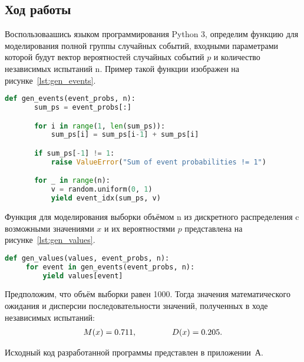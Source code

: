 \subsection{Ход работы}

Воспользоваашись языком программирования Python 3, определим функцию для
моделирования полной группы случайных событий, входными параметрами которой
будут вектор вероятностей случайных событий $ p $ и количество независимых
испытаний n. Пример такой функции изображен на рисунке~\ref{lst:gen_events}.
\begin{lstlisting}[caption=Функция для моделирования полной группы случайных событий,
label=lst:gen_events, language=python, basicstyle=\scriptsize\ttfamily]
  def gen_events(event_probs, n):
       sum_ps = event_probs[:]

       for i in range(1, len(sum_ps)):
           sum_ps[i] = sum_ps[i-1] + sum_ps[i]

       if sum_ps[-1] != 1:
           raise ValueError("Sum of event probabilities != 1")

       for _ in range(n):
           v = random.uniform(0, 1)
           yield event_idx(sum_ps, v)
\end{lstlisting}

Функция для моделирования выборки объёмом n из дискретного распределения c
возможными значениями $ x $ и их вероятностями $ p $ представлена на
рисунке~\ref{lst:gen_values}.
\begin{lstlisting}[caption=Функция для моделирования выборки объёмом $n$ из
дискретного распределения с возможными значениями $ x $ и их вероятностями $ p $,
label=lst:gen_values, language=python, basicstyle=\scriptsize\ttfamily]
   def gen_values(values, event_probs, n):
     for event in gen_events(event_probs, n):
         yield values[event]
\end{lstlisting}

Предположим, что объём выборки равен 1000. Тогда значения математического
ожидания и дисперсии последовательности значений, полученных
в ходе независимых испытаний:
\begin{align*}
  M(x) = 0.711, \hspace{15mm} D(x) = 0.205.
\end{align*}

Исходный код разработанной программы представлен в приложении~А.

\newpage
